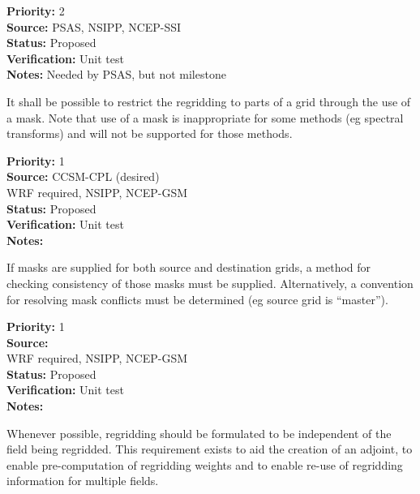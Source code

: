 \begin{reqlist}
{\bf Priority:} 2 \\
{\bf Source:} PSAS, NSIPP, NCEP-SSI \\
{\bf Status:} Proposed \\
{\bf Verification:} Unit test \\
{\bf Notes:} Needed by PSAS, but not milestone
\end{reqlist}


It shall be possible to restrict the regridding to parts of a grid through 
the use of a mask.  Note that use of a mask is inappropriate for some methods 
(eg spectral transforms) and will not be supported for those methods.

\begin{reqlist}
{\bf Priority:} 1 \\
{\bf Source:} CCSM-CPL (desired) \\
              WRF required, NSIPP, NCEP-GSM \\
{\bf Status:} Proposed \\
{\bf Verification:} Unit test \\
{\bf Notes:} 
\end{reqlist}


If masks are supplied for both source and destination grids, a
method for checking consistency of those masks must be supplied.
Alternatively, a convention for resolving mask conflicts must
be determined (eg source grid is ``master'').

\begin{reqlist}
{\bf Priority:} 1 \\
{\bf Source:}  \\
              WRF required, NSIPP, NCEP-GSM \\
{\bf Status:} Proposed \\
{\bf Verification:} Unit test \\
{\bf Notes:} 
\end{reqlist}


Whenever possible, regridding should be formulated to be
independent of the field being regridded.  This requirement exists to
aid the creation of an adjoint, to enable pre-computation of regridding
weights and to enable re-use of regridding information for multiple
fields.

